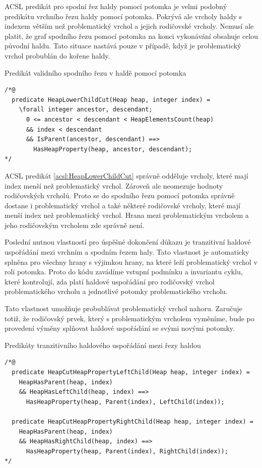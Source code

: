 ACSL predikát pro spodní řez haldy pomocí potomka je velmi podobný predikátu vrchního řezu haldy pomocí potomka. Pokrývá ale vrcholy haldy s indexem větším než problematický vrchol a jejich rodičovské vrcholy. Nemusí ale platit, že graf spodního řezu pomocí potomka na konci vykonávání obsahuje celou původní haldu. Tato situace nastává pouze v případě, když je problematický vrchol probublán do kořene haldy.

\begin{listing}[H]
	\caption{Predikát validního spodního řezu v haldě pomocí potomka}
	\label{acsl:HeapLowerChildCut}
	\begin{verbatim}
/*@
  predicate HeapLowerChildCut(Heap heap, integer index) =
    \forall integer ancestor, descendant;
      0 <= ancestor < descendant < HeapElementsCount(heap)
      && index < descendant
      && IsParent(ancestor, descendant) ==>
        HasHeapProperty(heap, ancestor, descendant);
*/
	\end{verbatim}
\end{listing}

ACSL predikát \ref{acsl:HeapLowerChildCut} správně odděluje vrcholy, které mají index menší než problematický vrchol. Zároveň ale neomezuje hodnoty rodičovských vrcholů. Proto se do spodního řezu pomocí potomka správně dostane i problematický vrchol a také některé rodičovské vrcholy, které mají menší index než problematický vrchol. Hrana mezi problematickým vrcholem a jeho rodičovským vrcholem zde správně není.

Poslední nutnou vlastností pro úspěšné dokončení důkazu je tranzitivní haldové uspořádání mezi vrchním a spodním řezem haly. Tato vlastnost je automaticky splněna pro všechny hrany s výjimkou hrany, na které leží problematický vrchol v roli potomka. Proto do kódu zavádíme vstupní podmínku a invariantu cyklu, které kontrolují, zda platí haldové uspořádání pro rodičovský vrchol problematického vrcholu a jednotlivé potomky problematického vrcholu.

Tato vlastnost umožňuje probublávat problematický vrchol nahoru. Zaručuje totiž, že rodičovský prvek, který s problematickým vrcholem vyměníme, bude po provedení výměny splňovat haldové uspořádání se svými novými potomky.

\begin{listing}[H]
	\caption{Predikáty tranzitivního haldového uspořádání mezi řezy haldou}
	\begin{verbatim}
/*@
  predicate HeapCutHeapPropertyLeftChild(Heap heap, integer index) = 
    HeapHasParent(heap, index)
    && HeapHasLeftChild(heap, index) ==>
      HasHeapProperty(heap, Parent(index), LeftChild(index));

  predicate HeapCutHeapPropertyRightChild(Heap heap, integer index) =
    HeapHasParent(heap, index)
    && HeapHasRightChild(heap, index) ==>
      HasHeapProperty(heap, Parent(index), RightChild(index));
*/
	\end{verbatim}
\end{listing}

